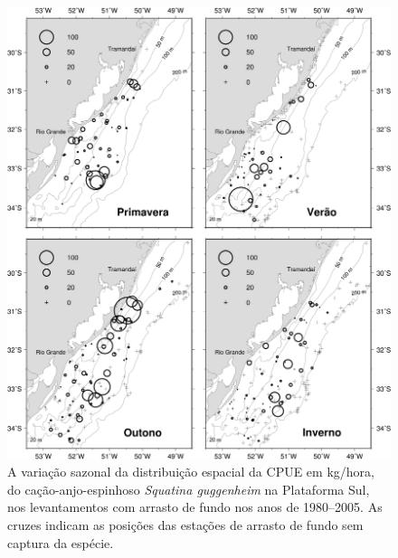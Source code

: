 \documentclass[a4paper,11pt,twoside,showtrims,onecolumn,openright,final]{memoir}
\begin{document}
\begin{figure}
\begin{center}
\includegraphics[width=\textwidth]{Guggenheim_mapa_Distribuicao_CPUE}
\end{center}
\caption[Variação sazonal da distribuição espacial da CPUE em kg/hora, do cação-anjo-espinhoso \emph{Squatina guggenheim}]
	{A variação sazonal da distribuição espacial da CPUE em kg/hora, do cação-anjo-espinhoso \emph{Squatina guggenheim} 
	 na Plataforma Sul, nos levantamentos com arrasto de fundo nos anos de 1980--2005. 
	 As cruzes indicam as posições das estações de arrasto de fundo sem captura da espécie.}
\label{fig:guggenheim-mapacpue}
\end{figure}

	  
\end{document}
